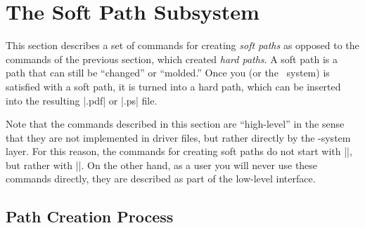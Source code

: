 %
%
%



\section{The Soft Path Subsystem}

\label{section-soft-paths}

\makeatletter


This section describes a set of commands for creating \emph{soft
  paths} as opposed to the commands of the previous section, which
created \emph{hard paths}. A soft path is a path that can still be
``changed'' or ``molded.'' Once you (or the \pgfname\ system) is
satisfied with a soft path, it is turned into a hard path, which can
be inserted into the resulting |.pdf| or |.ps| file.

Note that the commands described in this section are ``high-level'' in
the sense that they are not implemented in driver files, but rather
directly by the \pgfname-system layer. For this reason, the commands for
creating soft paths do not start with |\pgfsys@|, but rather with
|\pgfsyssoftpath@|. On the other hand, as a user you will never use
these commands directly, they are described as part of the
low-level interface. 



\subsection{Path Creation Process}

